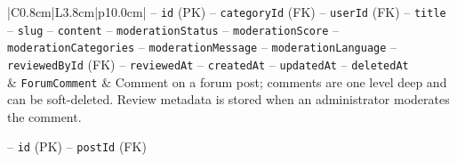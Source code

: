 \begin{center}
\begin{longtable}{|C{0.8cm}|L{3.8cm}|p{10.0cm}|}
\hspace*{1em}-- \texttt{id} (PK) \newline
\hspace*{1em}-- \texttt{category\allowbreak Id} (FK) \newline
\hspace*{1em}-- \texttt{user\allowbreak Id} (FK) \newline
\hspace*{1em}-- \texttt{title} \newline
\hspace*{1em}-- \texttt{slug} \newline
\hspace*{1em}-- \texttt{content} \newline
\hspace*{1em}-- \texttt{moderation\allowbreak Status} \newline
\hspace*{1em}-- \texttt{moderation\allowbreak Score} \newline
\hspace*{1em}-- \texttt{moderation\allowbreak Categories} \newline
\hspace*{1em}-- \texttt{moderation\allowbreak Message} \newline
\hspace*{1em}-- \texttt{moderation\allowbreak Language} \newline
\hspace*{1em}-- \texttt{reviewed\allowbreak By\allowbreak Id} (FK) \newline
\hspace*{1em}-- \texttt{reviewed\allowbreak At} \newline
\hspace*{1em}-- \texttt{created\allowbreak At} \newline
\hspace*{1em}-- \texttt{updated\allowbreak At} \newline
\hspace*{1em}-- \texttt{deleted\allowbreak At} \\
 & \texttt{Forum\allowbreak Comment} & Comment on a forum post; comments are one level deep and can be soft-deleted. Review metadata is stored when an administrator moderates the comment.\par\smallskip
\hspace*{1em}-- \texttt{id} (PK) \newline
\hspace*{1em}-- \texttt{post\allowbreak Id} (FK) \newline

\end{longtable}
\end{center}
